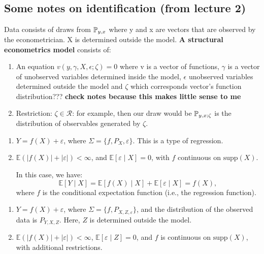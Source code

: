 \documentclass{article}
\begin{document}
\subsection{Some notes on identification (from lecture 2)}
Data consists of draws from \(\mathbb{P}_{y,x}\) where y and x are vectors that are observed by the econometrician. X is determined outside the model. \textbf{A structural econometrics model} consists of: \begin{enumerate}
    \item An equation \(v(y, \gamma, X, \epsilon; \zeta )=0\) where v is a vector of functions, \(\gamma\) is a vector of unobserved variables determined inside the model, \(\epsilon\) unobserved variables determined outside the model and \(\zeta\) which corresponds vector's function distribution??? \textbf{check notes because this makes little sense to me}
    \item Restriction: \(\zeta \in \mathcal{R}\): for example, then our draw would be \(\mathbb{P}_{y,x;\zeta}\) is the distribution of observables generated by \(\zeta\). 
\end{enumerate} 


\begin{example}
    \begin{enumerate}
        \item \( Y = f(X) + \varepsilon \), where \( \Sigma = \{f, P_{X}, \varepsilon\} \). This is a type of regression.
        \item \( \mathbb{E}(|f(X)| + |\varepsilon|) < \infty \), and \( \mathbb{E}[\varepsilon \mid X] = 0 \), with \(f\) continuous on \(\text{supp}(X)\).
    
        In this case, we have:
        \[
        \mathbb{E}[Y \mid X] = \mathbb{E}[f(X) \mid X] + \mathbb{E}[\varepsilon \mid X] = f(X),
        \]
        where \(f\) is the conditional expectation function (i.e., the regression function).
    \end{enumerate}
    \end{example}
    
    \begin{example}
    \begin{enumerate}
        \item \( Y = f(X) + \varepsilon \), where \( \Sigma = \{f, P_{X,Z,\varepsilon}\} \), and the distribution of the observed data is \( P_{Y,X,Z} \). Here, \( Z \) is determined outside the model.
        \item \( \mathbb{E}(|f(X)| + |\varepsilon|) < \infty \), \( \mathbb{E}[\varepsilon \mid Z] = 0 \), and \(f\) is continuous on \(\text{supp}(X)\), with additional restrictions.
    \end{enumerate}
    \end{example}
    
\end{document}
